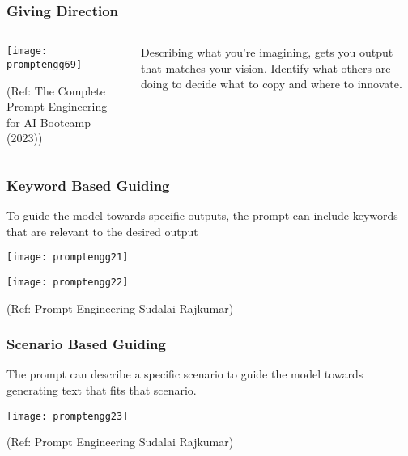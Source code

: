 \begin{frame}[fragile]\frametitle{Giving Direction}

\begin{columns}
    \begin{column}[T]{0.6\linewidth}
		\begin{center}
		\texttt{[image: promptengg69]}

		{\tiny (Ref: The Complete Prompt Engineering for AI Bootcamp (2023))}
		\end{center}	
    \end{column}
    \begin{column}[T]{0.4\linewidth}
		Describing what you’re imagining, gets you output that matches your vision.
		Identify what others are doing to decide what to copy and where to innovate.
    \end{column}
  \end{columns}
\end{frame}

\begin{frame}[fragile]\frametitle{ Keyword Based Guiding}

To guide the model towards specific outputs, the prompt can include 
keywords that are relevant to the desired output

\begin{center}
\texttt{[image: promptengg21]}

\texttt{[image: promptengg22]}

{\tiny (Ref: Prompt Engineering Sudalai Rajkumar)}

\end{center}		
	
\end{frame}

\begin{frame}[fragile]\frametitle{ Scenario Based Guiding}

The prompt can describe a specific scenario to guide the model towards 
generating text that fits that scenario.

\begin{center}
\texttt{[image: promptengg23]}

{\tiny (Ref: Prompt Engineering Sudalai Rajkumar)}

\end{center}		

\end{frame}

